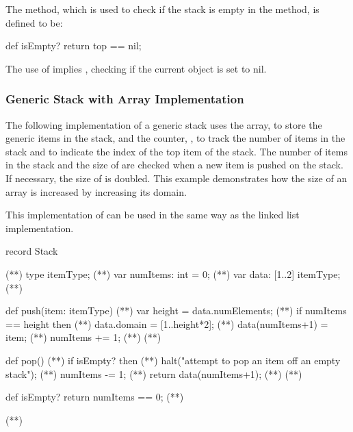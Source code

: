 The  method, which is used to check if the stack
is empty in the  method, is defined to be:
\begin{chapel}
  def isEmpty? return top == nil;   
\end{chapel}
The use of  implies , checking if the
current  object is set to nil.

\subsubsection{Generic Stack with Array Implementation}
The following implementation of a generic stack uses the array,
 to store the generic items in the stack, and the
counter, , to track the
number of items in the stack and to indicate the index of
the top item of the stack.  The number of items in the stack
and the size of  are checked when a new item is pushed
on the stack.  If necessary, the size of  is doubled.
This example demonstrates how the size of an array is increased 
by increasing its domain.

This implementation of  can be used in the same
way as the linked list implementation.

\begin{numberedchapel}
record Stack {                     (*\label{stack_array_start}*)
  type itemType;                   (*\label{stack_array_itemtype}*)
  var numItems: int = 0;           (*\label{stack_array_numitems}*)
  var data: [1..2] itemType;       (*\label{stack_array_data}*)

  def push(item: itemType) {       (*\label{stack_array_push_start}*)
    var height = data.numElements;  (*\label{stack_array_push_height}*)
    if numItems == height then      (*\label{stack_array_push_check_height}*)
      data.domain = [1..height*2];  (*\label{stack_array_push_incr_dom}*)
    data(numItems+1) = item;        (*\label{stack_array_push_new_item}*)
    numItems += 1;                  (*\label{stack_array_push_num_incr}*)
  }                                 (*\label{stack_array_push_end}*)

  def pop() {                       (*\label{stack_array_pop_start}*)
    if isEmpty? then                (*\label{stack_array_pop_empty_1}*)
      halt("attempt to pop an item off an empty stack"); (*\label{stack_array_pop_empty_2}*)
    numItems -= 1;                  (*\label{stack_array_pop_num_dec}*)
    return data(numItems+1);        (*\label{stack_array_pop_return}*)
  }                                 (*\label{stack_array_pop_end}*)

  def isEmpty? return numItems == 0; (*\label{stack_array_isempty}*)
}                                   (*\label{stack_array_end}*)
\end{numberedchapel}

